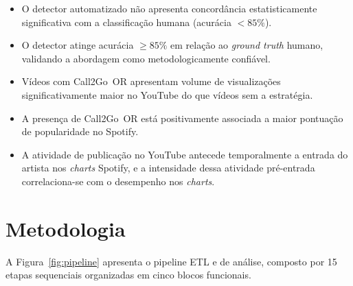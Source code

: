 ﻿\documentclass[12pt]{article}
\begin{document}
\begin{itemize}
  \item[$H_0$] O detector automatizado não apresenta concordância
    estatisticamente significativa com a classificação humana (acurácia
    $< 85\%$).
  \item[$H_1$] O detector atinge acurácia $\geq 85\%$ em relação ao
    \textit{ground truth} humano, validando a abordagem como metodologicamente
    confiável.
  \item[$H_2$] Vídeos com Call2Go~OR apresentam volume de visualizações
    significativamente maior no YouTube do que vídeos sem a estratégia.
  \item[$H_3$] A presença de Call2Go~OR está positivamente associada a maior
    pontuação de popularidade no Spotify.
  \item[$H_4$] A atividade de publicação no YouTube antecede temporalmente a
    entrada do artista nos \textit{charts} Spotify, e a intensidade dessa
    atividade pré-entrada correlaciona-se com o desempenho nos \textit{charts}.
\end{itemize}

\section{Metodologia}
\label{sec:metodologia}

A Figura~\ref{fig:pipeline} apresenta o pipeline ETL e de análise, composto
por 15 etapas sequenciais organizadas em cinco blocos funcionais.
\end{document}
